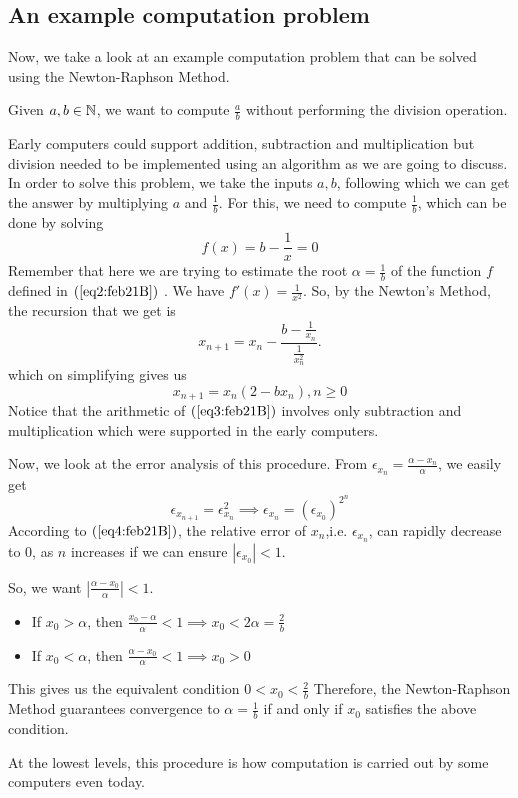 \subsection{An example computation problem}

	Now, we take a look at an example computation problem that can be solved using the Newton-Raphson Method.

	Given $a,b \in \mathbb{N}$, we want to compute $\frac{a}{b}$ without performing the division operation.
	
	Early computers could support addition, subtraction and multiplication but division needed to be implemented using an algorithm as we are going to discuss.
	In order to solve this problem, we take the inputs $a,b$, following which we can get the answer by multiplying  $a$ and  $\frac{1}{b}$. For this, we need to compute $\frac{1}{b}$, which can be done by solving 
\begin{equation}\label{eq2:feb21B}
	f(x) = b - \frac{1}{x} = 0 
\end{equation}
Remember that here we are trying to estimate the root $\alpha = \frac{1}{b}$ of the function $f$ defined in $\left( \ref{eq2:feb21B}\right) $ . 
	We have $f'(x) = \frac{1}{x^2}$. So, by the Newton's Method, the recursion that we get is 
	\[
		x_{n+1} = x_n - \frac{b-\frac{1}{x_n}}{\frac{1}{x_n^2}}
	.\] 
	which on simplifying gives us
	\begin{equation}\label{eq3:feb21B}
		x_{n+1} = x_n\left( 2-bx_n \right), n \geq 0 
	\end{equation}
	Notice that the arithmetic of $\left( \ref{eq3:feb21B} \right) $ involves only subtraction and multiplication which were supported in the early computers.

	Now, we look at the error analysis of this procedure.
	From $\epsilon_{x_n} = \frac{\alpha-x_n}{\alpha}$, we easily get
	\begin{equation}\label{eq4:feb21B}
	 \epsilon_{x_{n+1}} = \epsilon_{x_n}^2 \implies \epsilon_{x_n} = \left( \epsilon_{x_0} \right)^{2^n} 
 \end{equation}
 According to $\left( \ref{eq4:feb21B} \right) $, the relative error of $x_n$,i.e. $\epsilon_{x_n}$, can rapidly decrease to $0$, as $n$ increases if we can ensure $|\epsilon_{x_0}| < 1$.

	So, we want $|\frac{\alpha - x_0}{\alpha}| < 1$.
	\begin{itemize}
		\item If $x_0 > \alpha$, then  $\frac{x_0-\alpha}{\alpha} < 1 \implies x_0 < 2\alpha = \frac{2}{b}$\\
		\item If $ x_0 < \alpha$, then $\frac{\alpha - x_0}{\alpha} < 1 \implies x_0 > 0$
	\end{itemize}
	This gives us the equivalent condition $0 < x_0 < \frac{2}{b}$ 
	Therefore, the Newton-Raphson Method guarantees convergence to $\alpha = \frac{1}{b}$ if and only if $x_0$ satisfies the above condition.

	At the lowest levels, this procedure is how computation is carried out by some computers even today.
